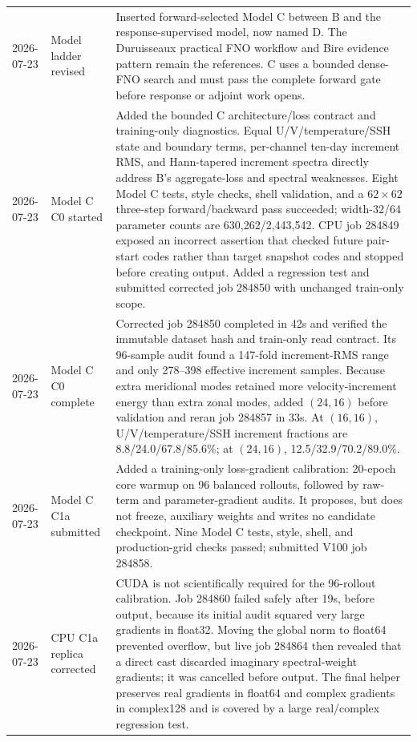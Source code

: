 \documentclass[11pt]{article}
\begin{document}
\begin{longtable}{@{}p{}p{}p{}@{}}
2026-07-23 & Model ladder revised & Inserted forward-selected Model C between B and the response-supervised model, now named D.  The Duruisseaux practical FNO workflow and Bire evidence pattern remain the references.  C uses a bounded dense-FNO search and must pass the complete forward gate before response or adjoint work opens. \\
2026-07-23 & Model C C0 started & Added the bounded C architecture/loss contract and training-only diagnostics.  Equal U/V/temperature/SSH state and boundary terms, per-channel ten-day increment RMS, and Hann-tapered increment spectra directly address B's aggregate-loss and spectral weaknesses.  Eight Model C tests, style checks, shell validation, and a $62\times62$ three-step forward/backward pass succeeded; width-32/64 parameter counts are 630,262/2,443,542.  CPU job 284849 exposed an incorrect assertion that checked future pair-start codes rather than target snapshot codes and stopped before creating output.  Added a regression test and submitted corrected job 284850 with unchanged train-only scope. \\
2026-07-23 & Model C C0 complete & Corrected job 284850 completed in 42s and verified the immutable dataset hash and train-only read contract.  Its 96-sample audit found a 147-fold increment-RMS range and only 278--398 effective increment samples.  Because extra meridional modes retained more velocity-increment energy than extra zonal modes, added \((24,16)\) before validation and reran job 284857 in 33s.  At \((16,16)\), U/V/temperature/SSH increment fractions are 8.8/24.0/67.8/85.6\%; at \((24,16)\), 12.5/32.9/70.2/89.0\%. \\
2026-07-23 & Model C C1a submitted & Added a training-only loss-gradient calibration: 20-epoch core warmup on 96 balanced rollouts, followed by raw-term and parameter-gradient audits.  It proposes, but does not freeze, auxiliary weights and writes no candidate checkpoint.  Nine Model C tests, style, shell, and production-grid checks passed; submitted V100 job 284858. \\
2026-07-23 & CPU C1a replica corrected & CUDA is not scientifically required for the 96-rollout calibration.  Job 284860 failed safely after 19s, before output, because its initial audit squared very large gradients in float32.  Moving the global norm to float64 prevented overflow, but live job 284864 then revealed that a direct cast discarded imaginary spectral-weight gradients; it was cancelled before output.  The final helper preserves real gradients in float64 and complex gradients in complex128 and is covered by a large real/complex regression test. \\

\end{longtable}
\end{document}
